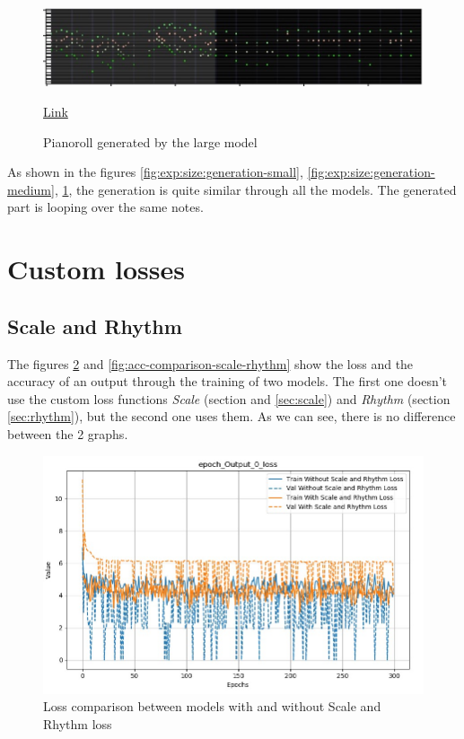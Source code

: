 \documentclass[12pt]{report}
\begin{document}
\begin{figure}[htbp]
    \centering
    \includegraphics[width=\textwidth]{images/experiences/size/generation-comparison-size-large.jpg}
    \caption{Pianoroll generated by the large model}
    \href{https://github.com/ValentinVignal/midiGenerator/blob/master/samples/mode-size-comparison/large.mid}{Link}
    \label{fig:exp:size:generation-large}
\end{figure}

As shown in the figures \ref{fig:exp:size:generation-small}, \ref{fig:exp:size:generation-medium}, \ref{fig:exp:size:generation-large}, the generation is quite similar through all the models.
The generated part is looping over the same notes.


\section{Custom losses}

\subsection{Scale and Rhythm}

The figures \ref{fig:loss-comparison-scale-rhythm} and \ref{fig:acc-comparison-scale-rhythm} show the loss and the accuracy of an output through the training of two models.
The first one doesn't use the custom loss functions \textit{Scale} (section and \ref{sec:scale}) and \textit{Rhythm} (section \ref{sec:rhythm}), but the second one uses them.
As we can see, there is no difference between the 2 graphs.

\begin{figure}[ht]
    \centering
    \includegraphics[width=\textwidth]{images/experiences/scale_rhythm/loss-comparison-scale-rhythm.jpg}
    \caption{Loss comparison between models with and without Scale and Rhythm loss}
    \label{fig:loss-comparison-scale-rhythm}
\end{figure}
\end{document}
